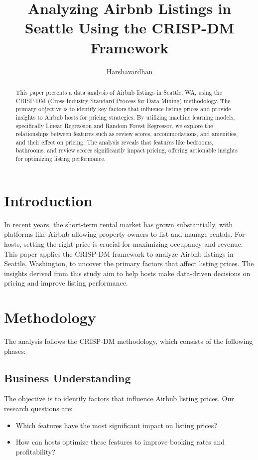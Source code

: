 \documentclass[12pt]{article}
\title{Analyzing Airbnb Listings in Seattle Using the CRISP-DM Framework}
\author{Harshavardhan}
\begin{document}
\maketitle

\begin{abstract}
This paper presents a data analysis of Airbnb listings in Seattle, WA, using the CRISP-DM (Cross-Industry Standard Process for Data Mining) methodology. The primary objective is to identify key factors that influence listing prices and provide insights to Airbnb hosts for pricing strategies. By utilizing machine learning models, specifically Linear Regression and Random Forest Regressor, we explore the relationships between features such as review scores, accommodations, and amenities, and their effect on pricing. The analysis reveals that features like bedrooms, bathrooms, and review scores significantly impact pricing, offering actionable insights for optimizing listing performance.
\end{abstract}

\section{Introduction}
In recent years, the short-term rental market has grown substantially, with platforms like Airbnb allowing property owners to list and manage rentals. For hosts, setting the right price is crucial for maximizing occupancy and revenue. This paper applies the CRISP-DM framework to analyze Airbnb listings in Seattle, Washington, to uncover the primary factors that affect listing prices. The insights derived from this study aim to help hosts make data-driven decisions on pricing and improve listing performance.

\section{Methodology}
The analysis follows the CRISP-DM methodology, which consists of the following phases:

\subsection{Business Understanding}
The objective is to identify factors that influence Airbnb listing prices. Our research questions are:
\begin{itemize}
    \item Which features have the most significant impact on listing prices?
    \item How can hosts optimize these features to improve booking rates and profitability?
\end{itemize}
\end{document}
